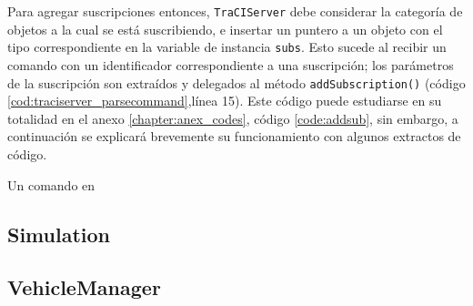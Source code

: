 Para agregar suscripciones entonces, \texttt{TraCIServer} debe considerar la categoría de objetos a la cual se está suscribiendo, e insertar un puntero a un objeto con el tipo correspondiente en la variable de instancia \texttt{subs}. Esto sucede al recibir un comando con un identificador correspondiente a una suscripción; los parámetros de la suscripción son extraídos y delegados al método \texttt{addSubscription()} (código \ref{cod:traciserver_parsecommand},línea 15). Este código puede estudiarse en su totalidad en el anexo \ref{chapter:anex_codes}, código \ref{code:addsub}, sin embargo, a continuación se explicará brevemente su funcionamiento con algunos extractos de código.

Un comando en 

    
%    

\subsection{Simulation}\label{sec:simulation}
\subsection{VehicleManager}\label{sec:vehiclemanager}